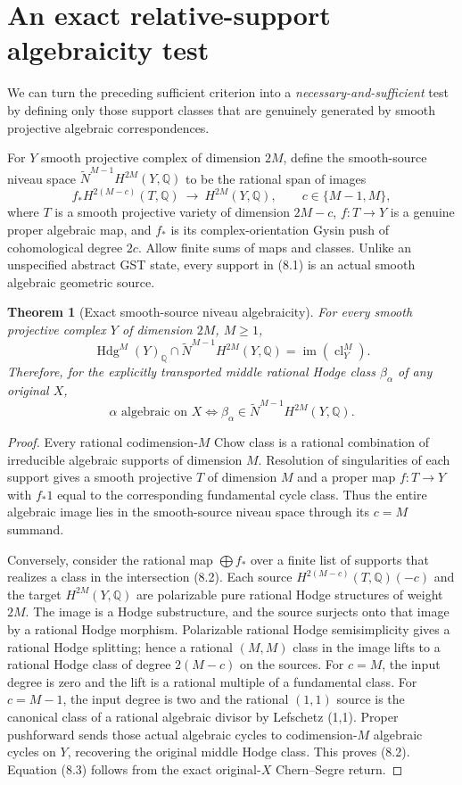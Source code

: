 \documentclass[11pt]{article}
\newcommand{\Q}{\mathbb Q}
\newcommand{\Hdg}{\operatorname{Hdg}}
\newcommand{\cl}{\operatorname{cl}}
\newtheorem{theorem}{Theorem}[section]
\begin{document}
\section{An exact relative-support algebraicity test}
We can turn the preceding sufficient criterion
into a \emph{necessary-and-sufficient}
test by defining only those support classes
that are genuinely generated by smooth
projective algebraic correspondences.

For \(Y\) smooth projective complex
of dimension \(2M\), define the
smooth-source niveau space
\(\widetilde N^{M-1}H^{2M}(Y,\Q)\)
to be the rational span of images
\[
 f_* H^{2(M-c)}(T,\Q)
 \ \longrightarrow\ H^{2M}(Y,\Q),
 \qquad c\in\{M-1,M\},
 \tag{8.1}
\]
where \(T\) is a smooth projective
variety of dimension \(2M-c\),
\(f:T\to Y\) is a genuine proper
algebraic map, and \(f_*\) is its
complex-orientation Gysin push of
cohomological degree \(2c\).
Allow finite sums of maps and
classes. Unlike an unspecified
abstract GST state, every support
in (8.1) is an actual smooth
algebraic geometric source.

\begin{theorem}[Exact smooth-source niveau algebraicity]
For every smooth projective complex
\(Y\) of dimension \(2M\), \(M\ge1\),
\[
 \boxed{
 \Hdg^M(Y)_\Q\cap
 \widetilde N^{M-1}H^{2M}(Y,\Q)
 =\operatorname{im}(\cl_Y^M).}
 \tag{8.2}
\]
Therefore, for the explicitly transported
middle rational Hodge class
\(\beta_\alpha\) of any original \(X\),
\[
 \boxed{
 \alpha\text{ algebraic on }X
 \iff
 \beta_\alpha\in
 \widetilde N^{M-1}H^{2M}(Y,\Q).}
 \tag{8.3}
\]
\end{theorem}
\begin{proof}
Every rational codimension-\(M\)
Chow class is a rational combination
of irreducible algebraic supports of
dimension \(M\). Resolution of
singularities of each support gives
a smooth projective \(T\) of
dimension \(M\) and a proper map
\(f:T\to Y\) with \(f_*1\)
equal to the corresponding
fundamental cycle class. Thus
the entire algebraic image lies
in the smooth-source niveau
space through its \(c=M\) summand.

Conversely, consider the rational
map \(\bigoplus f_*\) over a finite
list of supports that realizes a
class in the intersection (8.2).
Each source \(H^{2(M-c)}(T,\Q)(-c)\)
and the target \(H^{2M}(Y,\Q)\)
are polarizable pure rational Hodge
structures of weight \(2M\).
The image is a Hodge substructure,
and the source surjects onto that
image by a rational Hodge
morphism. Polarizable rational
Hodge semisimplicity gives a
rational Hodge splitting; hence
a rational \((M,M)\) class in
the image lifts to a rational
Hodge class of degree
\(2(M-c)\) on the sources.
For \(c=M\), the input
degree is zero and the lift
is a rational multiple of a
fundamental class. For \(c=M-1\),
the input degree is two and
the rational \((1,1)\) source
is the canonical class of a
rational algebraic divisor by
Lefschetz (1,1). Proper
pushforward sends those
actual algebraic cycles to
codimension-\(M\) algebraic
cycles on \(Y\), recovering
the original middle Hodge
class. This proves (8.2).
Equation (8.3) follows from
the exact original-\(X\)
Chern--Segre return.
\end{proof}
\end{document}
